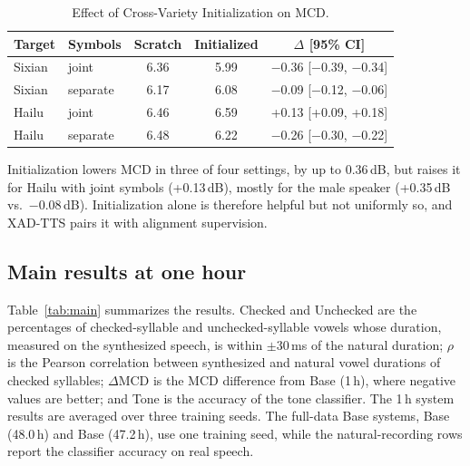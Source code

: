 \documentclass[conference,a4paper]{IEEEtran}
\begin{document}
\begin{table}[H]
\centering
\caption{Effect of Cross-Variety Initialization on MCD.}
\label{tab:transfer}
\footnotesize
\begin{tabular}{llccc}
\toprule
Target & Symbols & Scratch & Initialized & $\Delta$ [95\% CI] \\
\midrule
Sixian & joint    & 6.36 & 5.99 & $-$0.36 [$-$0.39, $-$0.34] \\
Sixian & separate & 6.17 & 6.08 & $-$0.09 [$-$0.12, $-$0.06] \\
Hailu  & joint    & 6.46 & 6.59 & +0.13 [+0.09, +0.18] \\
Hailu  & separate & 6.48 & 6.22 & $-$0.26 [$-$0.30, $-$0.22] \\
\bottomrule
\end{tabular}
\end{table}

Initialization lowers MCD in three of four settings, by up to 0.36\,dB, but raises it for Hailu with joint symbols (+0.13\,dB), mostly for the male speaker (+0.35\,dB vs.\ $-$0.08\,dB). Initialization alone is therefore helpful but not uniformly so, and XAD-TTS pairs it with alignment supervision.

\subsection{Main results at one hour}
Table~\ref{tab:main} summarizes the results. Checked and Unchecked are the percentages of checked-syllable and unchecked-syllable vowels whose duration, measured on the synthesized speech, is within $\pm$30\,ms of the natural duration; $\rho$ is the Pearson correlation between synthesized and natural vowel durations of checked syllables; $\Delta$MCD is the MCD difference from Base (1\,h), where negative values are better; and Tone is the accuracy of the tone classifier. The 1\,h system results are averaged over three training seeds. The full-data Base systems, Base (48.0\,h) and Base (47.2\,h), use one training seed, while the natural-recording rows report the classifier accuracy on real speech.
\end{document}
